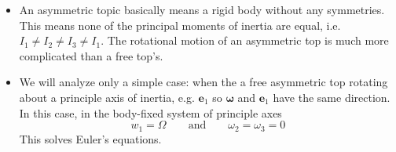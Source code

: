 \documentclass[11pt, a4paper]{article}
\newcommand{\eqtext}[1]{\qquad \text{#1} \qquad}
\newcommand{\e}{\bm{e}} %
\begin{document}
\begin{itemize}
	\item An asymmetric topic basically means a rigid body without any symmetries. This means none of the principal moments of inertia are equal, i.e. $ I_{1} \neq I_{2} \neq I_{3} \neq I_{1} $. The rotational motion of an asymmetric top is much more complicated than a free top's. 
	
	\item We will analyze only a simple case: when the a free asymmetric top rotating about a principle axis of inertia, e.g. $ \e_{1} $ so $ \bm{\omega} $ and $ \e_{1} $ have the same direction. In this case, in the body-fixed system of principle axes
	\begin{equation*}
		w_{1} = \Omega \eqtext{and} \omega_{2} = \omega_{3} = 0
	\end{equation*}
	This solves Euler's equations. 
	

\end{itemize}
\end{document}
